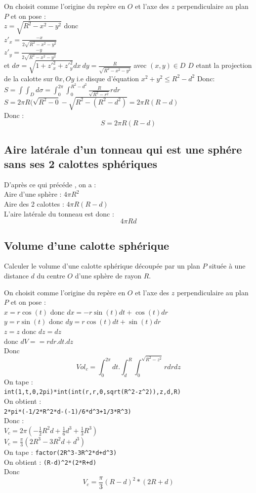 \documentclass[a4paper,11pt]{book}
\begin{document}
On choisit comme l'origine du rep\`ere en $O$ et l'axe des $z$ perpendiculaire 
au plan $P$ et on pose :\\
$z=\sqrt{R^2-x^2-y^2}$ donc \\
$z'_x=\frac{-x}{2\sqrt{R^2-x^2-y^2}}$\\
$z'_y=\frac{-y}{2\sqrt{R^2-x^2-y^2}}$\\
et $d\sigma=\sqrt{1+{z'}_x^2+{z'}_y^2}dx\ dy=\frac{R}{\sqrt{R^2-x^2-y^2}}$ avec 
$(x,y)\in D$ $D$ etant la projection de la calotte sur $0x,Oy$ i.e disque d'\'equation $x^2+y^2\leq R^2-d^2$
Donc:\\
$S=\int\int_Dd\sigma=\int_0^{2\pi}\int_0^{R^2-d^2}\frac{R}{\sqrt{R^2-r^2}}rdr$\\
$S=2\pi R(\sqrt{R^2-0}-\sqrt{R^2-(R^2-d^2)}=2\pi R(R-d)$\\
Donc :
$$S=2\pi R(R-d)$$
\subsection{Aire lat\'erale d'un tonneau qui est une sph\'ere sans ses 2 calottes sph\'eriques}
D'apr\`es ce qui pr\'ec\'ede , on a :\\
Aire d'une sph\`ere : $4\pi R^2$\\
Aire des 2 calottes : $4\pi R(R-d)$\\
L'aire lat\'erale du tonneau est donc :
$$4\pi Rd$$
\subsection{Volume d'une calotte sph\'erique}
Calculer le volume d'une calotte sph\'erique d\'ecoup\'ee par un plan $P$
situ\'ee \`a une distance $d$ du centre $O$ d'une sph\`ere de rayon $R$.

On choisit comme l'origine du rep\`ere en $O$ et l'axe des $z$ perpendiculaire 
au plan $P$ et on pose :\\
$x=r\cos(t)$ donc $dx=-r\sin(t)dt+\cos(t)dr$\\
$y=r\sin(t)$ donc $dy=r\cos(t)dt+\sin(t)dr$\\
$z=z$ donc $dz=dz$\\
donc $dV==rdr.dt.dz$\\
Donc 
$$Vol_c=\int_0^{2\pi}dt.\int_d^R\int_0^{\sqrt{R^2-z^2}}rdrdz$$
On tape :\\
{\tt int(1,t,0,2pi)*int(int(r,r,0,sqrt(R\verb|^|2-z\verb|^|2)),z,d,R)}\\
On obtient :\\
{\tt 2*pi*(-1/2*R\verb|^|2*d-(-1)/6*d\verb|^|3+1/3*R\verb|^|3)}\\
Donc :\\
$V_c=2\pi(-\frac{1}{2}R^2d+\frac{1}{6}d^3+\frac{1}{3}R^3)$\\
$V_c=\frac{\pi}{3}(2R^3-3R^2d+d^3)$\\
On tape : {\tt factor(2R\verb|^|3-3R\verb|^|2*d+d\verb|^|3)}\\
On obtient : {\tt (R-d)\verb|^|2*(2*R+d)}\\
Donc
$$V_c=\frac{\pi}{3}(R-d)^2*(2R+d) $$
\end{document}
